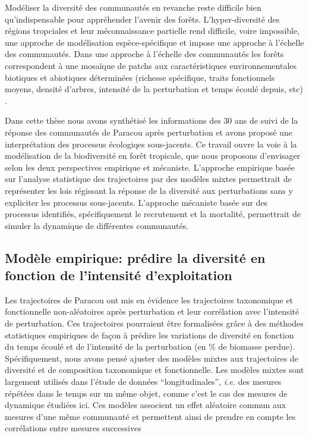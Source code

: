 \documentclass[
  11pt,
  french,
  A4paper,
  extrafontsizes,onecolumn,openright
  ]{memoir}
\begin{document}
Modéliser la diversité des communautés en revanche reste difficile bien
qu'indispensable pour appréhender l'avenir des forêts. L'hyper-diversité
des régions tropciales et leur méconnaissance partielle rend difficile,
voire impossible, une approche de modélisation espèce-spécifique et
impose une approche à l'échelle des communautés. Dans une approche à
l'échelle des communautés les forêts correspondent à une mosaïque de
patchs aux caractéristiques environnementales biotiques et abiotiques
déterminées (richesse spécifique, traits fonctionnels moyens, densité
d'arbres, intensité de la perturbation et temps écoulé depuis, etc)
\autocite{Porte2002}.

Dans cette thèse nous avons synthétisé les informations des 30 ans de
suivi de la réponse des communautés de Paracou après perturbation et
avons proposé une interprétation des processus écologiqes sous-jacents.
Ce travail ouvre la voie à la modélisation de la biodiversité en forêt
tropicale, que nous proposons d'envisager selon les deux perspectives
empirique et mécaniste. L'approche empirique basée sur l'analyse
statistique des trajectoires par des modèles mixtes permettrait de
représenter les lois régissant la réponse de la diversité aux
perturbations sans y expliciter les processus sous-jacents. L'approche
mécaniste basée sur des processus identifiés, spécifiquement le
recrutement et la mortalité, permettrait de simuler la dynamique de
différentes communautés.

\subsection{Modèle empirique: prédire la diversité en fonction de
l'intensité
d'exploitation}\label{modele-empirique-predire-la-diversite-en-fonction-de-lintensite-dexploitation}

Les trajectoires de Paracou ont mis en évidence les trajectoires
taxonomique et fonctionnelle non-aléatoires après perturbation et leur
corrélation avec l'intensité de perturbation. Ces trajectoires
pourraient être formalisées grâce à des méthodes statistiques empiriques
de façon à prédire les variations de diversité en fonction du temps
écoulé et de l'intensité de la perturbation (en \% de biomasse perdue).
Spécifiquement, nous avons pensé ajuster des modèles mixtes aux
trajectoires de diversité et de composition taxonomique et
fonctionnelle. Les modèles mixtes sont largement utilisés dans l'étude
de données ``longitudinales'', \emph{i.e.} des mesures répétées dans le
temps sur un même objet, comme c'est le cas des mesures de dynamique
étudiées ici. Ces modèles associent un effet aléatoire commun aux
mesures d'une même communauté et permettent ainsi de prendre en compte
les corrélations entre mesures successives
\end{document}
